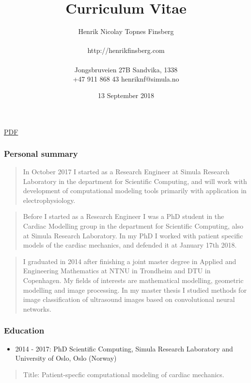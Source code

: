 \documentclass[11pt, a4paper]{article}
\title{Curriculum Vitae} %
\date{13 September 2018\\} %
\author{Henrik Nicolay Topnes Finsberg\\\\
  http://henrikfinsberg.com\\\\
Jongsbruveien 27B \textbar{} Sandvika, 1338\\ %
+47 911 868 43 \textbar{} henriknf@simula.no } %
\providecommand{\tightlist}{%
  \setlength{\itemsep}{0pt}\setlength{\parskip}{0pt}}
\begin{document}
\maketitle
\begin{raggedright}
\href{latex/cv.pdf}{PDF}

\hypertarget{personal-summary}{%
\subsubsection{Personal summary}\label{personal-summary}}

\begin{quote}
In October 2017 I started as a Research Engineer at Simula Research
Laboratory in the department for Scientific Computing, and will work
with development of computational modeling tools primarily with
application in electrophysiology.
\end{quote}

\begin{quote}
Before I started as a Research Engineer I was a PhD student in the
Cardiac Modelling group in the department for Scientific Computing, also
at Simula Research Laboratory. In my PhD I worked with patient specific
models of the cardiac mechanics, and defended it at January 17th 2018.
\end{quote}

\begin{quote}
I graduated in 2014 after finishing a joint master degree in Applied and
Engineering Mathematics at NTNU in Trondheim and DTU in Copenhagen. My
fields of interests are mathematical modelling, geometric modelling and
image processing. In my master thesis I studied methods for image
classification of ultrasound images based on convolutional neural
networks.
\end{quote}

\hypertarget{education}{%
\subsubsection{Education}\label{education}}

\begin{itemize}
\tightlist
\item
  2014 - 2017: PhD Scientific Computing, Simula Research Laboratory and
  University of Oslo, Oslo (Norway)
\end{itemize}

\begin{quote}
Title: Patient-specfic computational modeling of cardiac mechanics.
\end{quote}


\end{raggedright}
\end{document}
